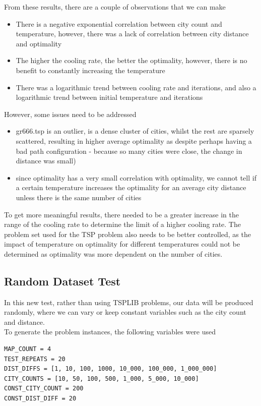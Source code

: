 \documentclass{article}
\begin{document}
From these results, there are a couple of observations that we can make
\begin{itemize}
    \item There is a negative exponential correlation between city count and temperature, however, there was a lack of correlation between city distance and optimality
    \item The higher the cooling rate, the better the optimality, however, there is no benefit to constantly increasing the temperature
    \item There was a logarithmic trend between cooling rate and iterations, and also a logarithmic trend between initial temperature and iterations
\end{itemize}

However, some issues need to be addressed
\begin{itemize}
    \item gr666.tsp is an outlier, is a dense cluster of cities, whilst the rest are sparsely scattered, resulting in higher average optimality as despite perhaps having a bad path configuration - because so many cities were close, the change in distance was small)
    \item since optimality has a very small correlation with optimality, we cannot tell if a certain temperature increases the optimality for an average city distance unless there is the same number of cities
\end{itemize}

To get more meaningful results, there needed to be a greater increase in the range of the cooling rate to determine the limit of a higher cooling rate.
The problem set used for the TSP problem also needs to be better controlled, as the impact of temperature on optimality for different temperatures could not be determined as optimality was more dependent on the number of cities.

\subsection{Random Dataset Test}
In this new test, rather than using TSPLIB problems, our data will be produced randomly, where we can vary or keep constant variables such as the city count and distance.
\\

To generate the problem instances, the following variables were used

\begin{verbatim}
MAP_COUNT = 4
TEST_REPEATS = 20
DIST_DIFFS = [1, 10, 100, 1000, 10_000, 100_000, 1_000_000]
CITY_COUNTS = [10, 50, 100, 500, 1_000, 5_000, 10_000]
CONST_CITY_COUNT = 200
CONST_DIST_DIFF = 20
\end{verbatim}
\end{document}
